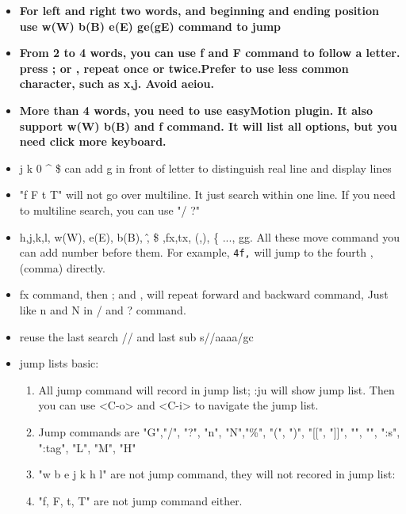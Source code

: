 \documentclass[a4paper,12pt,twoside]{book}
\begin{document}
\begin{itemize}
\begin{center}
\begin{tabular}{p{}|p{}|p{}}
\end{tabular}
\end{center} 

		\item \textbf{For left and right two words, and beginning and ending position use w(W) b(B) e(E) ge(gE) command to jump}
						
		\item \textbf{From 2 to 4 words, you can use f and F command to follow a letter. press ; or , repeat once or twice.Prefer to use less common character, such as x,j. Avoid aeiou.}

		\item \textbf{More than 4 words, you need to use easyMotion plugin. It also support w(W) b(B) and f command. It will list all options, but you need click more keyboard.}

		\item j k 0 \^{} \$ can add g in front of letter to distinguish real line and display lines

		\item "f F t T" will not go over multiline. It just search within one line. If you need to multiline search, you can use "/ ?"

		\item h,j,k,l, w(W), e(E), b(B), \^ , \$ ,fx,tx, (,), \{ ..., gg. All these move command you can add number before them. For example, \verb=4f,= will jump to the fourth ,(comma) directly.    

		\item fx command, then ; and , will repeat forward and backward command, Just like n and N in / and ? command.

		\item reuse the last search // and last sub s//aaaa/gc				

	\item jump lists basic:
\begin{enumerate}
		\item All jump command will record in jump list; :ju will show jump list. Then you can use <C-o> and <C-i> to navigate the jump list. 
				
	\item Jump commands are "G","/", "?", "n", "N","\%", "(", ")", "[[", "]]", "{", "}", ":s", ":tag", "L", "M", "H"

	\item "w b e j k h l" are not jump command, they will not recored in jump list:

	\item "f, F, t, T" are not jump command either.


\end{enumerate}
\end{itemize}
\end{document}
